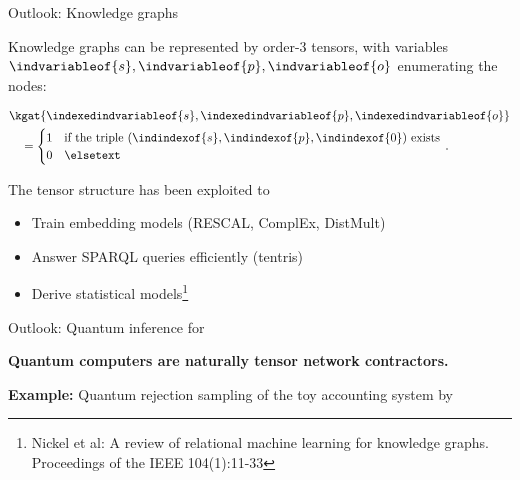 \documentclass{beamer}
\begin{document}
    \begin{frame}{Outlook: Knowledge graphs}

        Knowledge graphs can be represented by order-3 tensors, with variables $\indvariableof{s},\indvariableof{p},\indvariableof{o}$ enumerating the nodes:

        \begin{minipage}{0.45\textwidth}
            \begin{align*}
                &\kgat{\indexedindvariableof{s},\indexedindvariableof{p},\indexedindvariableof{o}} \\
                & \quad = \begin{cases}
                              1 & \text{if the triple }(\indindexof{s},\indindexof{p},\indindexof{0}) \text{ exists} \\
                              0 & \elsetext
                \end{cases} \, .
            \end{align*}
        \end{minipage}
        \begin{minipage}{0.25\textwidth}
        \end{minipage}

        \medskip
        The tensor structure has been exploited to
        \begin{itemize}
            \item Train embedding models (RESCAL, ComplEx, DistMult)
            \item Answer SPARQL queries efficiently (tentris)
            \item Derive statistical models\footnote{\tiny Nickel et al: A review of relational machine learning for knowledge graphs. Proceedings of the IEEE 104(1):11-33}
        \end{itemize}
    \end{frame}


    \begin{frame}{Outlook: Quantum inference for \CompActNets{}}
        \begin{center}
            \bf Quantum computers are naturally tensor network contractors.
        \end{center}

            {\bf Example:} Quantum rejection sampling of the toy accounting system by
        \begin{center}
            
        \end{center}

    \end{frame}
\end{document}
